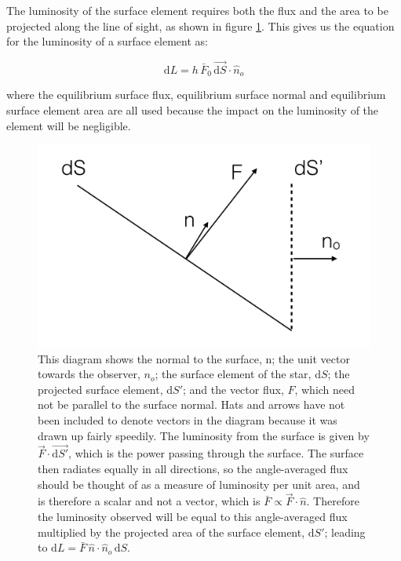 \documentclass[11pt]{amsart}
\begin{document}
The luminosity of the surface element requires both the flux and the area to be projected along the line of sight, as shown in figure \ref{fig:flux_diagram}.  This gives us the equation for the luminosity of a surface element as:

\begin{equation}
\text{d}L = h \, \bar{F}_{0} \, \vec{\text{d}S} \! \cdot \! \hat{n}_{o}
\end{equation}

where the equilibrium surface flux, equilibrium surface normal and equilibrium surface element area are all used because the impact on the luminosity of the element will be negligible.

\begin{figure}
\begin{center}
\includegraphics[width = 0.75 \textwidth]{flux_diagram.png}
\caption{This diagram shows the normal to the surface, n; the unit vector towards the observer, $n_{o}$; the surface element of the star, d$S$; the projected surface element, d$S'$; and the vector flux, $F$, which need not be parallel to the surface normal.  Hats and arrows have not been included to denote vectors in the diagram because it was drawn up fairly speedily.  The luminosity from the surface is given by $\vec{F} \! \cdot \! \vec{\text{d}S'}$, which is the power passing through the surface.  The surface then radiates equally in all directions, so the angle-averaged flux should be thought of as a measure of luminosity per unit area, and is therefore a scalar and not a vector, which is $\bar{F} \propto \vec{F} \! \cdot \! \hat{n}$.  Therefore the luminosity observed will be equal to this angle-averaged flux multiplied by the projected area of the surface element, $\text{d}S'$; leading to $\text{d}L = \bar{F} \, \hat{n} \! \cdot \! \hat{n}_{o} \, \text{d}S$.}
\label{fig:flux_diagram}
\end{center}
\end{figure}
\end{document}
